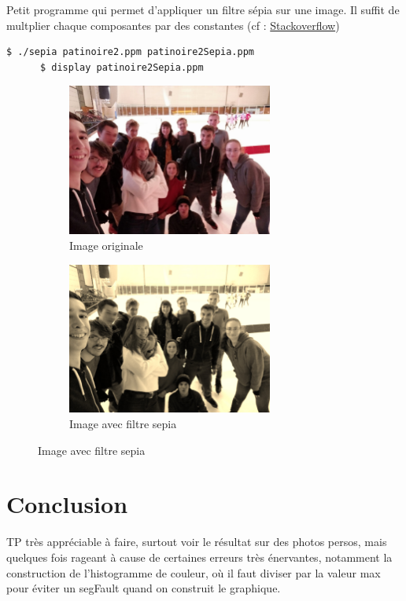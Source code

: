 \documentclass[a4paper,10pt]{article}
\begin{document}
    Petit programme qui permet d'appliquer un filtre sépia sur une image. Il suffit de multplier chaque composantes par des constantes (cf : \href{https://stackoverflow.com/questions/1061093/how-is-a-sepia-tone-created}{Stackoverflow})
    \begin{lstlisting}[language=Bash]
      $ ./sepia patinoire2.ppm patinoire2Sepia.ppm  
      $ display patinoire2Sepia.ppm
    \end{lstlisting}
    \begin{figure}[h]
      \begin{subfigure}{0.6\textwidth}
        \includegraphics[width=1\linewidth, height=5cm]{patinoire2}
        \caption{Image originale}
        \label{fig:patinoire2}
      \end{subfigure}
      \begin{subfigure}{0.6\textwidth}
        \includegraphics[width=1\linewidth, height=5cm]{patinoire2Sepia.jpeg}   
        \caption{Image avec filtre sepia}
        \label{fig:patinoireSepia}
      \end{subfigure}
    \end{figure}
    \section*{Conclusion}
    TP très appréciable à faire, surtout voir le résultat sur des photos persos, mais quelques fois rageant à cause de certaines erreurs très énervantes, notamment la construction de l'histogramme de couleur, où il faut diviser par la valeur max pour éviter un segFault quand on construit le graphique.
\end{document}
